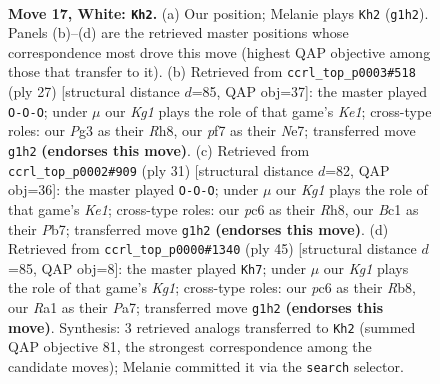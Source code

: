 \documentclass[11pt]{article}
\begin{document}
\begin{figure}[p]
\label{fig:thought-m30}
\end{figure}

\clearpage

\begin{figure}[p]\centering
\begin{subfigure}{0.46\textwidth}\centering
\resizebox{\linewidth}{!}{%
\newchessgame
\chessboard[
  setfen={r1b2rk1/5p2/2p2np1/2pqp1Np/p6P/2PP2P1/P1P2P2/R1B1QRK1 w - - 0 17},
  showmover=false,
  pgfstyle=straightmove, color=movearrow, markmove={g1-h2}
]}
\caption{}
\end{subfigure}\hfill
\begin{subfigure}{0.46\textwidth}\centering
\resizebox{\linewidth}{!}{%
\newchessgame
\chessboard[
  setfen={r3k2r/p3nqpp/np2p3/3pPp1P/P1pP4/B1P3Q1/2P1NPP1/R3K2R b KQkq - 1 14},
  showmover=false,
  pgfstyle=straightmove, color=movearrow, markmove={e8-c8}
]}
\caption{}
\end{subfigure}
\\[4pt]
\begin{subfigure}{0.46\textwidth}\centering
\resizebox{\linewidth}{!}{%
\newchessgame
\chessboard[
  setfen={r3k2r/ppp4p/1n1p1qp1/3Ppb2/2P4P/2N1QP2/PP4P1/2KR1B1R b kq - 0 16},
  showmover=false,
  pgfstyle=straightmove, color=movearrow, markmove={e8-c8}
]}
\caption{}
\end{subfigure}\hfill
\begin{subfigure}{0.46\textwidth}\centering
\resizebox{\linewidth}{!}{%
\newchessgame
\chessboard[
  setfen={1r3rk1/pb3p2/1q1p1p1p/2p1pP2/B1PnP3/P1NQR3/6PP/5RK1 b - - 1 23},
  showmover=false,
  pgfstyle=straightmove, color=movearrow, markmove={g8-h7}
]}
\caption{}
\end{subfigure}
\caption{\textbf{Move 17, White: \texttt{Kh2}.} (a) Our position; Melanie plays \texttt{Kh2} (\texttt{g1h2}). Panels (b)--(d) are the retrieved master positions whose correspondence most drove this move (highest QAP objective among those that transfer to it). (b) Retrieved from \texttt{ccrl\_top\_p0003\#518} (ply 27) [structural distance $d$=85, QAP obj=37]: the master played \texttt{O-O-O}; under $\mu$ our \emph{Kg1} plays the role of that game's \emph{Ke1}; cross-type roles: our \emph{P}g3 as their \emph{R}h8, our \emph{p}f7 as their \emph{N}e7; transferred move \texttt{g1h2} \textbf{(endorses this move)}. (c) Retrieved from \texttt{ccrl\_top\_p0002\#909} (ply 31) [structural distance $d$=82, QAP obj=36]: the master played \texttt{O-O-O}; under $\mu$ our \emph{Kg1} plays the role of that game's \emph{Ke1}; cross-type roles: our \emph{p}c6 as their \emph{R}h8, our \emph{B}c1 as their \emph{P}b7; transferred move \texttt{g1h2} \textbf{(endorses this move)}. (d) Retrieved from \texttt{ccrl\_top\_p0000\#1340} (ply 45) [structural distance $d$=85, QAP obj=8]: the master played \texttt{Kh7}; under $\mu$ our \emph{Kg1} plays the role of that game's \emph{Kg1}; cross-type roles: our \emph{p}c6 as their \emph{R}b8, our \emph{R}a1 as their \emph{P}a7; transferred move \texttt{g1h2} \textbf{(endorses this move)}. Synthesis: 3 retrieved analogs transferred to \texttt{Kh2} (summed QAP objective 81, the strongest correspondence among the candidate moves); Melanie committed it via the \texttt{search} selector.}

\end{figure}
\end{document}
